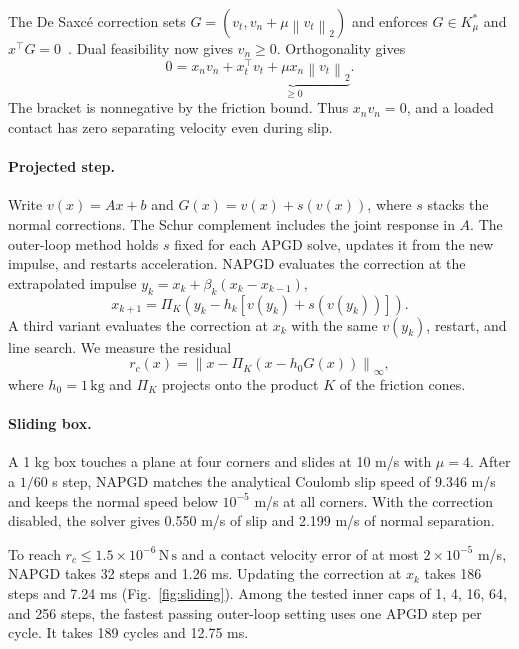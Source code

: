 \documentclass[conference]{IEEEtran}
\newcommand{\norm}[1]{\left\lVert #1\right\rVert}
\begin{document}
The De Saxc\'e correction sets \(G=(v_t,v_n+\mu\norm{v_t}_2)\) and enforces \(G\in K_\mu^*\) and \(x^\top G=0\)~\citep{acary}. Dual feasibility now gives \(v_n\geq0\). Orthogonality gives
\[
0=x_n v_n+\underbrace{x_t^\top v_t+\mu x_n\norm{v_t}_2}_{\geq 0}.
\]
The bracket is nonnegative by the friction bound. Thus \(x_n v_n=0\), and a loaded contact has zero separating velocity even during slip.

\paragraph{Projected step.} Write \(v(x)=Ax+b\) and \(G(x)=v(x)+s(v(x))\), where \(s\) stacks the normal corrections. The Schur complement includes the joint response in \(A\). The outer-loop method holds \(s\) fixed for each APGD solve, updates it from the new impulse, and restarts acceleration. NAPGD evaluates the correction at the extrapolated impulse \(y_k=x_k+\beta_k(x_k-x_{k-1})\),
\begin{equation}
 x_{k+1}=\Pi_K\!\left(y_k-h_k
   [v(y_k)+s(v(y_k))]\right).
 \label{eq:apgd}
\end{equation}
A third variant evaluates the correction at \(x_k\) with the same \(v(y_k)\), restart, and line search. We measure the residual
\begin{equation}
 r_c(x)=\norm{x-\Pi_K\!\left(x-h_0G(x)\right)}_\infty,
 \label{eq:contact}
\end{equation}
where \(h_0=1\,\mathrm{kg}\) and \(\Pi_K\) projects onto the product \(K\) of the friction cones.

\paragraph{Sliding box.} A 1 kg box touches a plane at four corners and slides at 10 m/s with \(\mu=4\). After a \(1/60\) s step, NAPGD matches the analytical Coulomb slip speed of 9.346 m/s and keeps the normal speed below \(10^{-5}\) m/s at all corners. With the correction disabled, the solver gives 0.550 m/s of slip and 2.199 m/s of normal separation.

To reach \(r_c\leq1.5\times10^{-6}\,\mathrm{N\,s}\) and a contact velocity error of at most \(2\times10^{-5}\) m/s, NAPGD takes 32 steps and 1.26 ms. Updating the correction at \(x_k\) takes 186 steps and 7.24 ms (Fig.~\ref{fig:sliding}). Among the tested inner caps of 1, 4, 16, 64, and 256 steps, the fastest passing outer-loop setting uses one APGD step per cycle. It takes 189 cycles and 12.75 ms.
\end{document}
